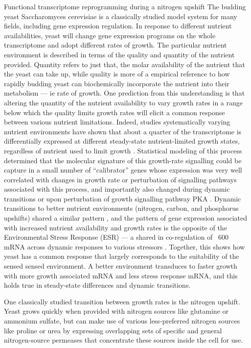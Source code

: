 Functional transcriptome reprogramming during a
nitrogen upshift The budding yeast Saccharomyces cerevisiae is a
classically studied model system for many fields, including gene
expression regulation. In response to different nutrient
availabilities, yeast will change gene expression programs on the
whole transcriptome and adopt different rates of growth. The
particular nutrient environment is described in terms of the quality
and quantity of the nutrient provided. Quantity refers to just that,
the molar availability of the nutrient that the yeast can take up,
while quality is more of a empirical reference to how rapidly budding
yeast can biochemically incorporate the nutrient into their metabolism
--- ie rate of growth. One prediction from this understanding is that
altering the quantity of the nutrient availability to vary growth
rates in a range below which the quality limits growth rates will
elicit a common response between various nutrient limitations.
Indeed, studies systematically varying nutrient environments have
shown that about a quarter of the transcriptome is differentially
expressed at different steady-state nutrient-limited growth states,
regardless of nutrient used to limit growth 
\citep{brauer2008coordination,regenberg2006growth}. 
Statistical modeling of this process
determined that the molecular signature of this growth-rate signalling
could be capture in a small number of “calibrator” genes whose
expression was very well correlated with changes in growth rate or
perturbation of signalling pathways associated with this process, and
importantly also changed during dynamic transitions or upon
perturbation of growth signalling pathway PKA 
\citep{airoldi2009predicting}.
Dynamic transitions to better nutrient environments (nitrogen, carbon,
and phosphorus upshifts) shared a similar pattern 
\citep{conway2012glucose}, 
and the pattern of gene expression associated with increased
nutrient availability and growth rates is the opposite of the
Environmental Stress Response (ESR) --- a shared in co-regulation of
~600 mRNA across dynamic responses to various stressors 
\citep{gasch2000genomic}. 
Together, this shows how yeast has a common response that
largely corresponds to the suitability of the sensed sensed
environment. A better environment transduces to faster growth with
more growth associated mRNA and less stress response mRNA, and this
holds true in steady-state differences and dynamic transitions.  

One
classically studied transition between growth rates is the nitrogen
upshift. Yeast grows quickly when provided with nitrogen sources like
glutamine or ammonium sulfate, but can make use of various
less-preferred nitrogen sources like proline or urea by expressing
overlapping sets of specific and general nitrogen-source permeases
that concentrate these sources inside the cell for use.  

